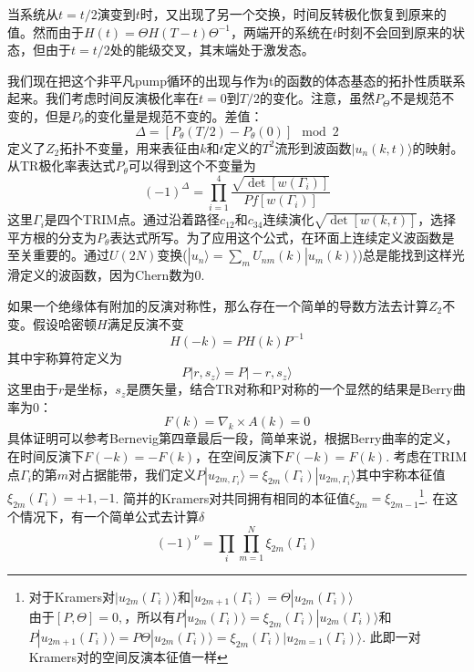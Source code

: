 \documentclass{article}
\numberwithin{equation}{subsection}
\begin{document}
当系统从$t= t /2$演变到$t$时，又出现了另一个交换，时间反转极化恢复到原来的值。然而由于$H(t)=\Theta H(T-t)\Theta^{-1}$，两端开的系统在$t$时刻不会回到原来的状态，但由于$t= t /2$处的能级交叉，其末端处于激发态。

我们现在把这个非平凡pump循环的出现与作为t的函数的体态基态的拓扑性质联系起来。我们考虑时间反演极化率在$t=0$到$T/2$的变化。注意，虽然$P_{\Theta}$不是规范不变的，但是$P_{\theta}$的变化量是规范不变的。差值：
\begin{equation}
    \Delta=[P_\theta(T/2)-P_\theta(0)]\mod{2}
\end{equation}
定义了$Z_2$拓扑不变量，用来表征由$k$和$t$定义的$T^2$流形到波函数$|u_n(k,t)\rangle$的映射。从TR极化率表达式$P_\theta$可以得到这个不变量为
\begin{equation}
    (-1)^\Delta=\prod_{i=1}^{4}\frac{\sqrt{\det[w(\Gamma_i)]}}{Pf[w(\Gamma_i)]}
\end{equation}
这里$\Gamma_i$是四个TRIM点。通过沿着路径$c_{12}$和$c_{34}$连续演化$\sqrt{\det[w(k,t)]}$，选择平方根的分支为$P_\theta$表达式所写。为了应用这个公式，在环面上连续定义波函数是至关重要的。通过$U(2N)$变换($|u_n\rangle=\sum_{m}U_{nm}(k)|u_{m}(k)\rangle$)总是能找到这样光滑定义的波函数，因为Chern数为$0$. 

如果一个绝缘体有附加的反演对称性，那么存在一个简单的导数方法去计算$Z_2$不变。假设哈密顿$H$满足反演不变
\begin{equation}
    H(-k)=PH(k)P^{-1}
\end{equation}
其中宇称算符定义为
\begin{equation}
    P|r,s_z\rangle=P|-r,s_z\rangle
\end{equation}
这里由于$r$是坐标，$s_z$是赝矢量，结合TR对称和P对称的一个显然的结果是Berry曲率为$0$：
\begin{equation}
    F(k)=\nabla_k\times A(k)=0
\end{equation}
具体证明可以参考Bernevig第四章最后一段，简单来说，根据Berry曲率的定义，在时间反演下$F(-k)=-F(k)$，在空间反演下$F(-k)=F(k)$. 考虑在TRIM点$\Gamma_i$的第$m$对占据能带，我们定义$P|u_{2m,\Gamma_i}\rangle=\xi_{2m}(\Gamma_i)|u_{2m,\Gamma_i}\rangle$其中宇称本征值$\xi_{2m}(\Gamma_i)=+1,-1$. 简并的Kramers对共同拥有相同的本征值$\xi_{2m}=\xi_{2m-1}$\footnote{对于Kramers对$|u_{2m}(\Gamma_i)\rangle$和$|u_{2m+1}(\Gamma_i)=\Theta|u_{2m}(\Gamma_i)\rangle$\\由于$[P,\Theta]=0,$，所以有$P|u_{2m}(\Gamma_i)\rangle=\xi_{2m}(\Gamma_i)|u_{2m}(\Gamma_i)\rangle$和$P|u_{2m+1}(\Gamma_i)\rangle=P\Theta|u_{2m}(\Gamma_i)\rangle=\xi_{2m}(\Gamma_i)|u_{2m=1}(\Gamma_i)\rangle$. 此即一对Kramers对的空间反演本征值一样}. 在这个情况下，有一个简单公式去计算$\delta$
\begin{equation}
    (-1)^{\nu}=\prod_{i}\prod_{m=1}^{N}\xi_{2m}(\Gamma_i)
\end{equation}
\end{document}
